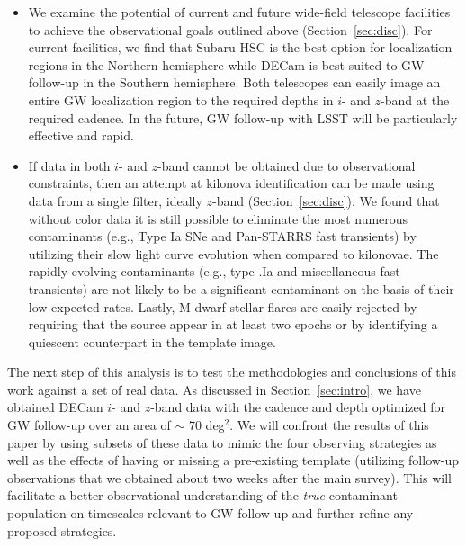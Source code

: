 \begin{itemize}
\item We examine the potential of current and future wide-field telescope facilities to achieve the observational goals outlined above (Section~\ref{sec:disc}). For current facilities, we find that Subaru HSC is the best option for localization regions in the Northern hemisphere while DECam is best suited to GW follow-up in the Southern hemisphere. Both telescopes can easily image an entire GW localization region to the required depths in $i$- and $z$-band at the required cadence. In the future, GW follow-up with LSST will be particularly effective and rapid.
\item  If data in both $i$- and $z$-band cannot be obtained due to observational constraints, then an attempt at kilonova identification can be made using data from a single filter, ideally $z$-band (Section~\ref{sec:disc}). We found that without color data it is still possible to eliminate the most numerous contaminants (e.g., Type Ia SNe and Pan-STARRS fast transients) by utilizing their slow light curve evolution when compared to kilonovae. The rapidly evolving contaminants (e.g., type .Ia and miscellaneous fast transients) are not likely to be a significant contaminant on the basis of their low expected rates. Lastly, M-dwarf stellar flares are easily rejected by requiring that the source appear in at least two epochs or by identifying a quiescent counterpart in the template image.
\end{itemize}

The next step of this analysis is to test the methodologies and conclusions of this work against a set of real data. As discussed in Section~\ref{sec:intro}, we have obtained DECam $i$- and $z$-band data with the cadence and depth optimized for GW follow-up over an area of $\sim$ 70 deg$^2$. We will confront the results of this paper by using subsets of these data to mimic the four observing strategies as well as the effects of having or missing a pre-existing template (utilizing follow-up observations that we obtained about two weeks after the main survey). This will facilitate a better observational understanding of the {\em true} contaminant population on timescales relevant to GW follow-up and further refine any proposed strategies.

